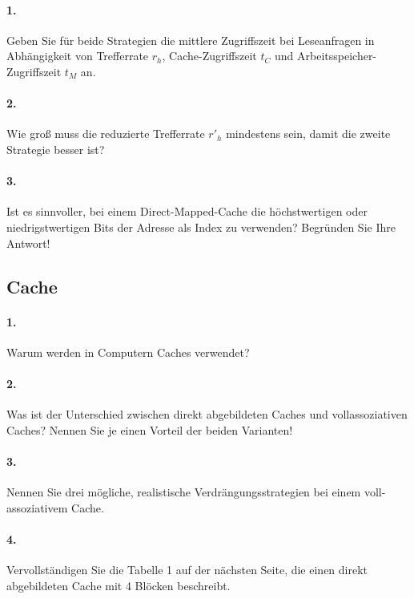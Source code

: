 \documentclass[paper=a4, fontsize=11pt]{scrartcl}
\numberwithin{equation}{section}
\numberwithin{figure}{section}
\numberwithin{table}{section}
\begin{document}
\paragraph{1.}
Geben Sie für beide Strategien die mittlere Zugriffszeit bei Leseanfragen in Abhängigkeit von Trefferrate $r_{h}$, Cache-Zugriffszeit $t_{C}$ und Arbeitsspeicher-Zugriffszeit $t_{M}$ an.

\paragraph{2.}
Wie groß muss die reduzierte Trefferrate $r'_{h}$ mindestens sein, damit die zweite Strategie besser ist?

\paragraph{3.}
Ist es sinnvoller, bei einem Direct-Mapped-Cache die höchstwertigen oder niedrigstwertigen Bits der Adresse als Index zu verwenden? Begründen Sie Ihre Antwort!

\subsection{Cache}

\paragraph{1.}
Warum werden in Computern Caches verwendet?

\paragraph{2.}
Was ist der Unterschied zwischen direkt abgebildeten Caches und vollassoziativen Caches? Nennen Sie je einen Vorteil der beiden Varianten!

\paragraph{3.}
Nennen Sie drei mögliche, realistische Verdrängungsstrategien bei einem voll-assoziativem Cache.

\paragraph{4.}
Vervollständigen Sie die Tabelle 1 auf der nächsten Seite, die einen direkt abgebildeten Cache mit 4 Blöcken beschreibt.
\end{document}

